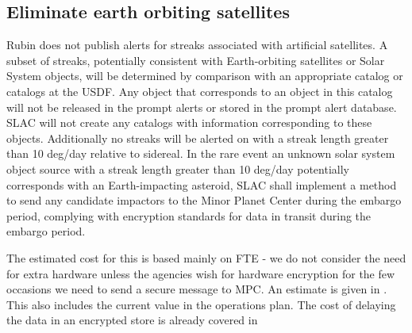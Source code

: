 
\subsection{Eliminate earth orbiting satellites} \label{sec:4eliminate}

Rubin does not publish alerts for streaks associated with artificial satellites.
A subset of streaks, potentially consistent with Earth-orbiting satellites or Solar System objects,
will be determined by comparison with an appropriate catalog or catalogs at the \gls{USDF}.
Any object that corresponds to an object in this catalog will not be released in the  prompt
alerts or stored in the prompt alert database.
SLAC will not create any catalogs with information corresponding to these objects.
Additionally no streaks will be  alerted on with a streak length greater than 10 deg/day relative to sidereal.
In the rare event an unknown solar system object source with a streak  length greater than 10 deg/day potentially corresponds with an Earth-impacting asteroid, SLAC shall implement a method to send any candidate  impactors to the Minor Planet Center during the embargo period, complying with encryption standards for data in transit during the embargo  period.

The estimated cost for this is based mainly on FTE - we do not consider the need for extra hardware unless the agencies wish for hardware encryption for the few occasions we need to send a secure message to \gls{MPC}.
An estimate is given in . This also includes the current value in the operations plan.
The cost of delaying the data in an encrypted store is already covered in 




